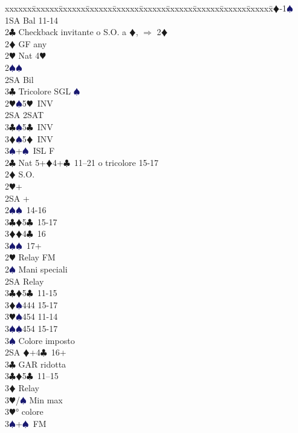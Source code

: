 \documentclass[a4paper,italian]{article}
\newcommand{\BC}{\textcolor{OliveGreen}{$\clubsuit$}}
\newcommand{\BD}{\textcolor{RedOrange}{$\vardiamondsuit$}}
\newcommand{\BH}{\textcolor{Red2}{$\varheartsuit${}}}
\newcommand{\BS}{\textcolor{MidnightBlue}{$\spadesuit${}}}
\newenvironment{bidtable}
{\begin{tabbing}

    xxxxxx\=xxxxxx\=xxxxxx\=xxxxxx\=xxxxxx\=xxxxxx\=xxxxxx\=xxxxxx\=xxxxxx\=xxxxxx\=\kill}
{\end{tabbing} }%
\begin{document}
\begin{multicols}{2}
    \begin{bidtable}
        1\BD-1\BS\+\\
        1SA \> Bal 11-14\+\\
        2\BC \> Checkback invitante o S.O. a \BD , $\Rightarrow$ 2\BD \\
        2\BD \> GF any\+\\
        2\BH \> Nat 4\BH \\
        2\BS {}\BS \\
        2SA \> Bil\\
        3\BC \> Tricolore SGL \BS \-\\
        2\BH {}\BS 5\BH\ INV\\
        2SA \> 2SAT\\
        3\BC {}\BS 5\BC\ INV\\
        3\BD {}\BS 5\BD\ INV\\
        3\BS {}+\BS\ ISL F\-\\
        2\BC \> Nat 5+\BD 4+\BC\ 11--21 o tricolore 15-17\+\\
        2\BD \> S.O.\+\\
        2\BH {}+\\
        2SA +\\
        2\BS {}\BS\ 14-16\\
        3\BC {}\BD 5\BC\ 15-17\\
        3\BD {}\BD 4\BC\ 16\\
        3\BS {}\BS\ 17+\-\\
        2\BH \> Relay FM\+\\
        2\BS \> Mani speciali\+\\
        2SA \> Relay\+\\
        3\BC {}\BD 5\BC\ 11-15\\
        3\BD {}\BS 444 15-17\\
        3\BH {}\BS 454 11-14\\
        3\BS {}\BS 454 15-17\-\\
        3\BS \> Colore imposto\-\\
        2SA \BD +4\BC\ 16+\+\\
        3\BC \> GAR ridotta\-\\
        3\BC {}\BD 5\BC\ 11--15\+\\
        3\BD \> Relay\+\\
        3\BH/\BS \> Min max\-\\
        3\BH {}° colore\\
        3\BS {}+\BS\ FM\-\\

\end{bidtable}
\end{multicols}
\end{document}
